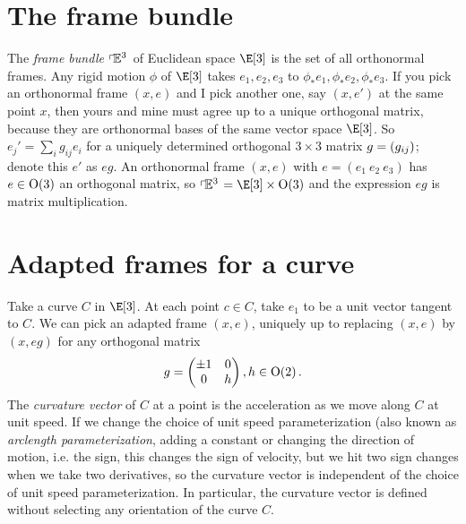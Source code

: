 \section{The frame bundle}
The \emph{frame bundle} \(\left\ulcorner\!\mathbb{E}^{3}\right.\) of Euclidean space \(\E[3]\) is the set of all orthonormal frames. 
Any rigid motion \(\phi\) of \(\E[3]\) takes \(e_1, e_2, e_3\) to \(\phi_* e_1, \phi_* e_2, \phi_* e_3\).
If you pick an orthonormal frame \((x,e)\) and I pick another one, say \((x,e')\) at the same point \(x\), then yours and mine must agree up to a unique orthogonal matrix, because they are orthonormal bases of the same vector space \(\E[3]\).
So \(e_j' = \sum_i g_{ij} e_i\) for a uniquely determined orthogonal \(3 \times 3\) matrix \(g=\left(g_{ij}\right)\); denote this \(e'\) as \(eg\).
An orthonormal frame \((x,e)\) with \(e=(e_1 \ e_2 \ e_3)\) has \(e \in \textrm{O}\!\left(3\right)\) an orthogonal matrix,  so \(\frameBundleE{3}=\E[3] \times \Orth{3}\) and the expression \(eg\) is matrix multiplication.

\section{Adapted frames for a curve}
Take a curve \(C\) in \(\E[3]\).
At each point \(c \in C\), take \(e_1\) to be a unit vector tangent to \(C\).
We can pick an adapted frame \((x,e)\), uniquely up to replacing \((x,e)\) by \((x,eg)\) for any orthogonal matrix
\[
g=
\begin{pmatrix}
\pm1&0\\
0&h
\end{pmatrix},
h\in\textrm{O}\!\left(2\right).
\]
The \emph{curvature vector}%
  of \(C\) at a point is the acceleration as we move along \(C\) at unit speed.
If we change the choice of unit speed parameterization (also known as \emph{arclength parameterization}, adding a constant or changing the direction of motion, i.e. the sign, this changes the sign of velocity, but we hit two sign changes when we take two derivatives, so the curvature vector is independent of the choice of unit speed parameterization.
In particular, the curvature vector is defined without selecting any orientation of the curve \(C\).

